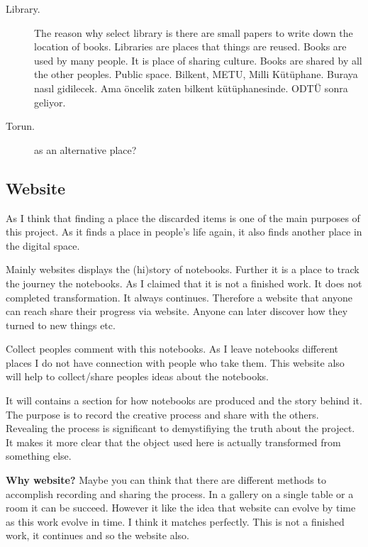 \begin{description}
\item[Library.] The reason why select library is there are small papers to write down the location of books. Libraries are places that things are reused. Books are used by many people. It is place of sharing culture. Books are shared by all the other peoples. Public space.
Bilkent, METU, Milli Kütüphane. Buraya nasıl gidilecek. Ama öncelik zaten bilkent kütüphanesinde. ODTÜ sonra geliyor. 
\item[Torun.] as an alternative place?
\end{description}





%
%
\subsection{Website}
As I think that finding a place the discarded items is one of the main purposes of this project. As it finds a place in people's life again, it also finds another place in the digital space.

Mainly websites displays the (hi)story of notebooks. Further it is a place to track the journey the notebooks. As I claimed that it is not a finished work. It does not completed transformation. It always continues. Therefore a website that anyone can reach share their progress via website. Anyone can later discover how they turned to new things etc. 

Collect peoples comment with this notebooks. As I leave notebooks different places I do not have connection with people who take them. This website also will help to collect/share peoples ideas about the notebooks.

It will contains a section for how notebooks are produced and the story behind it. The purpose is to record the creative process and share with the others. Revealing the process is significant to demystifiying the truth about the project. It makes it more clear that the object used here is actually transformed from something else. 

\textbf{Why website?} Maybe you can think that there are different methods to accomplish recording and sharing the process. In a gallery on a single table or a room it can be succeed. However it like the idea that website can evolve by time as this work evolve in time. I think it matches perfectly. This is not a finished work, it continues and so the website also. 

